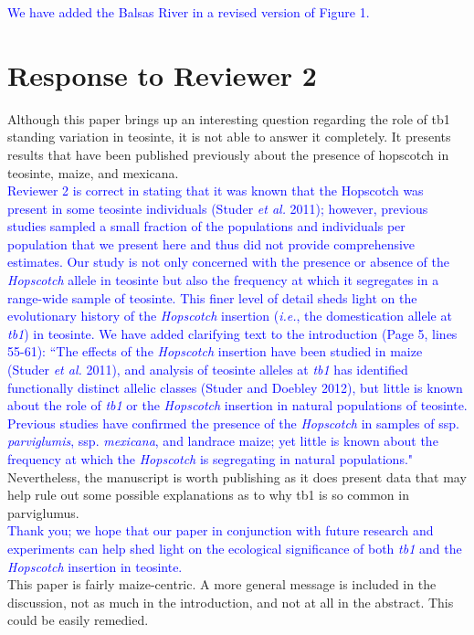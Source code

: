 \documentclass[11pt]{article}
\newcommand{\res}[1]{\noindent \textcolor{blue}{{#1}} \\}
\begin{document}
\res{We have added the Balsas River in a revised version of Figure 1.}


\section*{Response to Reviewer 2} 
Although this paper brings up an interesting question regarding the role of tb1 standing variation in teosinte, it is not able to answer it completely.  It presents results that have been published previously about the presence of hopscotch in teosinte, maize, and mexicana.\\ 

\res{Reviewer 2 is correct in stating that it was known that the Hopscotch was present in some teosinte individuals (Studer \emph{et al.} 2011); however, previous studies sampled a small fraction of the populations and individuals per population that we present here and thus did not provide comprehensive estimates. 
Our study is not only concerned with the presence or absence of the \emph{Hopscotch} allele in teosinte but also the frequency at which it segregates in a range-wide sample of teosinte.  
This finer level of detail sheds light on the evolutionary history of the \emph{Hopscotch} insertion (\emph{i.e.}, the domestication allele at \emph{tb1}) in teosinte. 
We have added clarifying text to the introduction (Page 5, lines 55-61): ``The effects of the \emph{Hopscotch} insertion have been studied in maize (Studer \emph{et al.} 2011), and analysis of teosinte alleles at \emph{tb1} has identified functionally distinct allelic classes (Studer and Doebley 2012), but little is known about the role of \emph{tb1} or the \emph{Hopscotch} insertion in natural populations of teosinte. Previous studies have confirmed the presence of the \emph{Hopscotch} in samples of ssp. \emph{parviglumis}, ssp. \emph{mexicana}, and landrace maize; yet little is known about the frequency at which the \emph{Hopscotch} is segregating in natural populations."}

Nevertheless, the manuscript is worth publishing as it does present data that may help rule out some possible explanations as to why tb1 is so common in parviglumus.\\

\res{Thank you; we hope that our paper in conjunction with future research and experiments can help shed light on the ecological significance of both \emph{tb1} and the \emph{Hopscotch} insertion in teosinte.}

This paper is fairly maize-centric. A more general message is included in the discussion, not as much in the introduction, and not at all in the abstract. This could be easily remedied.\\
\end{document}
